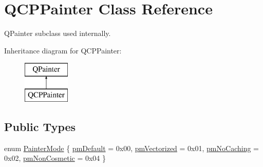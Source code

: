 \hypertarget{class_q_c_p_painter}{}\section{Q\+C\+P\+Painter Class Reference}
\label{class_q_c_p_painter}


Q\+Painter subclass used internally.  


Inheritance diagram for Q\+C\+P\+Painter\+:\begin{figure}[H]
\begin{center}
\leavevmode
\includegraphics[height=2.000000cm]{class_q_c_p_painter}
\end{center}
\end{figure}
\subsection*{Public Types}
\begin{DoxyCompactItemize}
\item 
enum \mbox{\hyperlink{class_q_c_p_painter_a156cf16444ff5e0d81a73c615fdb156d}{Painter\+Mode}} \{ \mbox{\hyperlink{class_q_c_p_painter_a156cf16444ff5e0d81a73c615fdb156da3bac5e87e3d58553b297befb4eee2a45}{pm\+Default}} = 0x00, 
\mbox{\hyperlink{class_q_c_p_painter_a156cf16444ff5e0d81a73c615fdb156daeda679cd55dcd468341d07d48a30b6ab}{pm\+Vectorized}} = 0x01, 
\mbox{\hyperlink{class_q_c_p_painter_a156cf16444ff5e0d81a73c615fdb156dae78f9a4eb277a5f9207f50850a51a0b0}{pm\+No\+Caching}} = 0x02, 
\mbox{\hyperlink{class_q_c_p_painter_a156cf16444ff5e0d81a73c615fdb156dac1e481bfaf408f2bd2eaad3ec341f36b}{pm\+Non\+Cosmetic}} = 0x04
 \}
\end{DoxyCompactItemize}
